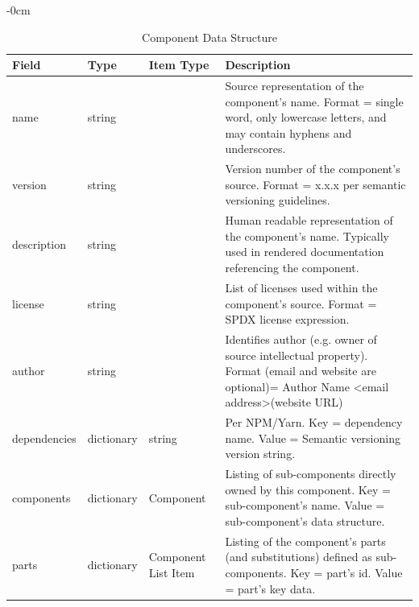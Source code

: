 \documentclass[journal,article,submit,pdftex,moreauthors]{Definitions/mdpi}
\begin{document}
\begin{table}[H] 
	\caption{Component Data Structure}
	\label{tab:component_data}
	\begin{adjustwidth}{-\extralength}{0cm}
	\begin{tabularx}{\fulllength}{CCCC}
	\toprule
	\textbf{Field}  & \textbf{Type}  & \textbf{Item Type}  & \textbf{Description}\\
	\midrule
	name          & string     &                       & Source   representation of the component's name. Format = single word, only lowercase   letters, and may contain hyphens and underscores.                                   \\ \hline
	version       & string     &                       & Version   number of the component's source. Format = x.x.x per semantic versioning   guidelines.                                                                            \\ \hline
	description   & string     &                       & Human   readable representation of the component's name. Typically used in rendered   documentation referencing the component.                                              \\ \hline
	license       & string     &                       & List of   licenses used within the component's source. Format = SPDX license   expression.                                                                                  \\ \hline
	author        & string     &                       & Identifies   author (e.g. owner of source intellectual property). Format (email and   website are optional)= Author Name \textless{}email address\textgreater (website URL) \\ \hline
	dependencies  & dictionary & string                & Per   NPM/Yarn. Key = dependency name. Value = Semantic versioning version string.                                                                                          \\ \hline
	components    & dictionary & Component             & Listing   of sub-components directly owned by this component. Key = sub-component's   name. Value = sub-component's data structure.                                         \\ \hline
	parts         & dictionary & Component   List Item & Listing   of the component's parts (and substitutions) defined as sub-components. Key =   part's id. Value = part's key data.                                               \\ \hline

\end{tabularx}
\end{adjustwidth}
\end{table}
\end{document}
